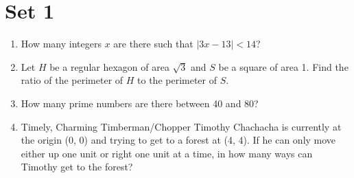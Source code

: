 \documentclass[11pt]{article}
\theoremstyle{definition}
\newcommand{\fdbox}[2]{\fbox{\sffamily\LARGE\vphantom y#1: \bfseries #2} \par\vspace{1em}} %
\begin{document}
\newcommand{\logo}{%
\begin{minipage}[b]{22em}
\centering\noindent
\\[0.5em]
\begin{minipage}[t][4em][t]{12em} \centering
{\huge \bfseries ${\bf 26^{\text{th}}}$ TJIMO } \\
\textsc{\large Alexandria, Virginia}
\end{minipage}
\end{minipage}
\vspace*{-0.05em}
}
\newcommand{\sevenpoints}{}
\newcommand{\righthead}{\fdbox{Round}{Guts}}


\section*{Set 1}
\begin{enumerate}
\setcounter{enumi}{0}
\item How many integers $x$ are there such that $\left| 3x - 13 \right| < 14$?
\item Let $H$ be a regular hexagon of area $\sqrt{3}$ and $S$ be a square of area 1. Find the ratio of the perimeter of $H$ to the perimeter of $S$.
\item How many prime numbers are there between 40 and 80?
\item Timely, Charming Timberman/Chopper Timothy Chachacha is currently at the origin (0, 0) and trying to get to a forest at (4, 4). If he can only move either up one unit or right one unit at a time, in how many ways can Timothy get to the forest?

\end{enumerate}

\eject
\end{document}
